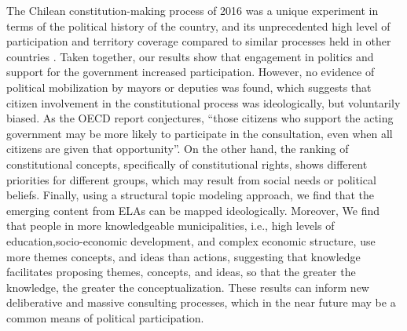 \documentclass[onecolumn]{article}
\begin{document}
The Chilean constitution-making process of 2016 was a unique experiment in terms of the political history of the country, and its unprecedented high level of participation and territory coverage compared to similar processes held in other countries \cite{ocde}. Taken together, our results show that engagement in politics and support for the government increased participation. However, no evidence of political mobilization by mayors or deputies was found, which suggests that citizen involvement in the constitutional process was ideologically, but voluntarily biased. As the OECD report conjectures, ``those citizens who support the acting government may be more likely to participate in the consultation, even when all citizens are given that opportunity''\cite{ocde}. On the other hand, the ranking of constitutional concepts, specifically of constitutional rights, shows different priorities for different groups, which may result from social needs or political beliefs. Finally, using a structural topic modeling approach, we find that the emerging content from ELAs can be mapped ideologically. Moreover, We find that people in more knowledgeable municipalities, i.e., high levels of education,socio-economic development, and complex economic structure, use more themes concepts, and ideas than actions, suggesting that knowledge facilitates proposing themes, concepts, and ideas, so that the greater the knowledge, the greater the conceptualization. These results can inform new deliberative and massive consulting processes, which in the near future may be a common means of political participation. 



\end{document}
